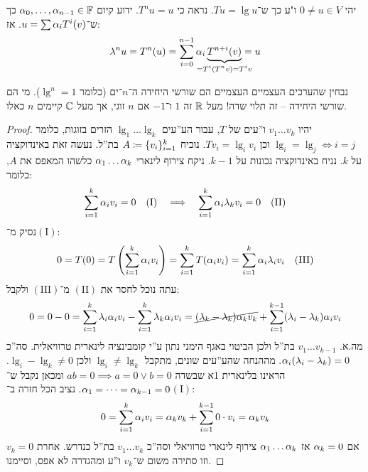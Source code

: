 \documentclass[name=רשימות אלגברה לינארית 2א]{../../../tex/classes/megasumPreamble}
\begin{document}
	יהי $0 \neq u \in V$ ו"ע כך ש־$Tu = \lg u$. נראה כי $T^nu = u$. ידוע קיום $\alpha_0, \dots, \alpha_{n - 1} \in \mathbb{F}$ כך ש־$u = \sum \alpha_iT^i(v)$. אז: 
	\[ \lg^nu = T^n(u) = \sum_{i = 0}^{n - 1}\ag_i\underbrace{T^{n + i}(v)}_{\mathclap{= T^i(T^nv) = T^iv}} = u \]
	
	נבחין שהערכים העצמיים העצמיים הם שורשי היחידה ה־$n$־ים (כלומר $\lg^{n} = 1$). מי הם שורשי היחידה – זה תלוי שדה! מעל $\mathbb{R}$ זה $1$ ו־$-1$ אם $n$ זוגי, אך מעל $\mathbb{C}$ קיימים $n$ כאלו. 
	
	
	\begin{proof}
		יהיו $v_1 \dots v_k$ ו''עים של $T$, עבור הע''עים $\lg_1 \dots \lg_k$ הזרים בזוגות, כלומר $\lg_i = \lg_j \iff i = j$ וכן $Tv_i = \lg_i v_i$. נוכיח $A\coloneqq\{v_i\}_{i = 1}^{k}$ בת''ל. 
		נעשה זאת באינדוקציה על $k$. נניח באינדוקציה נכונות על $k - 1$. ניקח צירוף לינארי $\alpha_1 \dots \alpha_k$ כלשהו המאפס את $A$, כלומר: 
		\begin{align*}
			\sum_{i = 1}^{k} \alpha_iv_i = 0 \quad (\mathrm{I}) && \implies && \sum_{i = 1}^{k} \alpha_i \lambda_k v_i = 0 \quad (\mathrm{II})
		\end{align*}
		נסיק מ־$(\mathrm{I})$:
		\[ 0 = T(0) = T\left ( \sum_{i = 1}^{k} \alpha_iv_i \right ) = \sum_{i = 1}^{k} T(\alpha_i v_i) = \sum_{i = 1}^{k} \alpha_i \lambda_i v_i \quad (\mathrm{III}) \]
		עתה נוכל לחסר את $(\mathrm{II})$ מ־$(\mathrm{III})$ ולקבל: 
		\[ 0 = 0 - 0 = \sum_{i = 1}^{k} \lambda_i\alpha_iv_i - \sum_{i = 1}^{k} \lambda_k\alpha_iv_i = \cancel{(\lambda_k - \lambda_k)\alpha_kv_k} + \sum_{i = 1}^{k - 1}(\lambda_i - \lambda_k)\alpha_i v_i \]
		מה.א. $v_1 \dots v_{k - 1}$ בת''ל ולכן הביטוי באגף הימני נתון ע''י קומבינציה לינארית טרוויאלית. סה''כ $\alpha_i(\lambda_i - \lambda_k) = 0$. מההנחה שהע''עים שונים, מתקבל $\lg_i \neq \lg_k$ ולכן $\lg_i - \lg_k \neq 0$. הראינו בלינארית 1א שבשדה $ab = 0 \implies a = 0 \lor b = 0$ ומכאן נקבל ש־$\alpha_1 = \cdots = \alpha_{k - 1} = 0$. נציב הכל חזרה ב־$(\mathrm{I})$: 
		\[ 0 = \sum_{i = 1}^{k} \alpha_i v_i = \alpha_kv_k + \sum_{i = 1}^{k - 1} 0 \cdot v_i = \alpha_k v_k \]
		אם $\alpha_k = 0$ אז $\alpha_1 \dots \alpha_k$ צירוף לינארי טרוויאלי וסה''כ $v_1 \dots v_k$ בת''ל כנדרש. אחרת $v_k= 0$ וזו סתירה משום ש־$v_k$ ו''ע ומהגדרה לא אפס, וסיימנו. 
	\end{proof}
	
	
\end{document}
